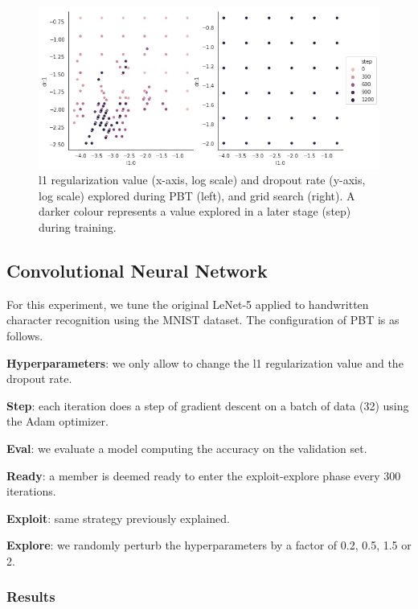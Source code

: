 \documentclass{article}
\begin{document}
\begin{figure}[H]
    \label{fig:evol2}
    \centering
    \includegraphics[width=\textwidth,height=\textheight,keepaspectratio]{hyperparameters_evolution2.png}
    \caption{l1 regularization value (x-axis, log scale) and dropout rate (y-axis, log scale) explored during PBT (left), and grid search (right). A darker colour represents a value explored in a later stage (step) during training.}
\end{figure}

\subsection{Convolutional Neural Network}
\label{sec:cnn}

For this experiment, we tune the original LeNet-5\cite{LeNet5} applied to handwritten character recognition using the MNIST dataset. The configuration of PBT is as follows.

\textbf{Hyperparameters}: we only allow to change the l1 regularization value and the dropout rate.

\textbf{Step}: each iteration does a step of gradient descent on a batch of data (32) using the Adam optimizer.

\textbf{Eval}: we evaluate a model computing the accuracy on the validation set.

\textbf{Ready}: a member is deemed ready to enter the exploit-explore phase every 300 iterations.

\textbf{Exploit}: same strategy previously explained.

\textbf{Explore}: we randomly perturb the hyperparameters by a factor of 0.2, 0.5, 1.5 or 2.

\subsubsection{Results}
\end{document}
